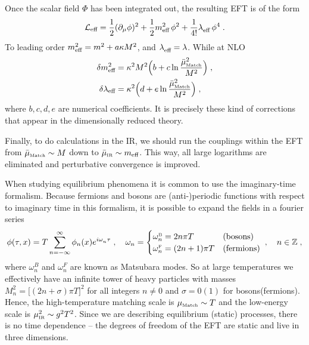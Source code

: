 \documentclass[11pt]{article}
\newcommand{\ko}{\omega} %
\newcommand{\bmu}{\bar\mu}
\renewcommand{\rmi}[1]{{\mbox{\scriptsize #1}}}
\newcommand{\rmii}[1]{{\mbox{\tiny\rm{#1}}}}
\begin{document}
Once the scalar field $\Phi$ has been integrated out,
the resulting EFT is of the form
\begin{align}
\mathcal{L}_\text{eff}=
    \frac{1}{2}(\partial_\mu \phi)^2
  + \frac{1}{2}m^2_\rmi{eff}\,\phi^2
  + \frac{1}{4!}\lambda_\rmi{eff}^{ }\,\phi^4
  \;.
\end{align}
To leading order
$m_\rmi{eff}^{2} = m^2 +a \kappa M^2$, and
$\lambda_\rmi{eff}^{ }=\lambda$.
While at NLO
\begin{align}
  \delta m_\text{eff}^2 &= \kappa^2M^2\Bigl(b+c \ln\frac{\bmu^2_\rmii{Match}}{M^2}\Bigr)
  \;,\\
  \delta \lambda_\rmi{eff} &= \kappa^2\Bigl(d+e \ln\frac{\bmu^2_\rmii{Match}}{M^2}\Bigr)
  \;,
\end{align}
where
$b,c,d,e$ are numerical coefficients.
It is precisely these kind of corrections that appear in the dimensionally reduced theory.

Finally, to do calculations in the IR, we should run the couplings within the EFT from
$\bmu_\rmii{Match}\sim M$ down to
$\bmu_\rmii{IR}\sim m_\rmi{eff}$.
This way, all large logarithms are eliminated and
perturbative convergence is improved.

When studying equilibrium phenomena it is common to use the imaginary-time formalism. Because fermions and bosons are (anti-)periodic functions with respect to imaginary time in this formalism, it is possible to expand the fields in a fourier series~\cite{Matsubara:1955ws}
\begin{equation}
  \phi(\tau,x) =
    T \sum_{n=-\infty}^{\infty}
    \phi_{n}(x) e^{i\ko^{ }_{n}\tau}
  \;,\quad
  \ko_{n} =
    \begin{cases}
      \omega^{\rmii{B}}_{n} = 2n\pi T &(\text{bosons})\\
      \omega^{\rmii{F}}_{n} = (2n+1)\pi T &(\text{fermions})
    \end{cases}
  \;,\quad
  n\in\mathbb{Z}
  \;,
\end{equation}
where $\omega_n^B$ and $\omega_n^F$ are known as Matsubara modes.
So at large temperatures we effectively have an infinite tower of heavy particles
with masses
$M_n^2=\bigl[ (2n + \sigma)\pi T \bigr]^2$ for all integers $n\neq 0$
and
$\sigma = 0(1)$
for bosons(fermions).
Hence,
the high-temperature matching scale is
$\mu_\rmii{Match}\sim T$ and
the low-energy scale is
$\mu_\rmii{IR}^2\sim g^2 T^2$.
Since we are describing equilibrium (static) processes,
there is no time dependence --
the degrees of freedom of the EFT are static and live in three dimensions.
\end{document}
